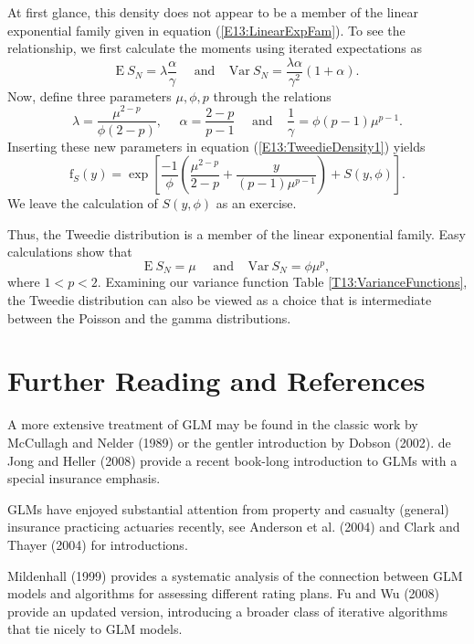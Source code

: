 At first glance, this density does not appear to be a member of the
linear exponential family given in equation
(\ref{E13:LinearExpFam}). To see the relationship, we first
calculate the moments using iterated expectations as
\begin{equation}\label{E13:MomentsTweedie}
\mathrm{E~}S_N = \lambda
\frac{\alpha}{\gamma}~~~~~~\mathrm{and}~~~~~ \mathrm{Var~}S_N =
\frac{\lambda \alpha}{\gamma^2} (1+\alpha).
\end{equation}
Now, define three parameters $\mu, \phi,  p$ through the relations
\begin{equation*}
\lambda = \frac{\mu^{2-p}}{\phi (2-p)},~~~~~~\alpha =
\frac{2-p}{p-1}~~~~~~\mathrm{and}~~~~~ \frac{1}{\gamma} =
\phi(p-1)\mu^{p-1}.
\end{equation*}
Inserting these new parameters in equation
(\ref{E13:TweedieDensity1}) yields
\begin{equation}\label{E13:TweedieDensity2}
\mathrm{f}_{S}(y) = \exp \left[ \frac{-1}{\phi} \left(
\frac{\mu^{2-p}}{2-p} + \frac{y}{(p-1)\mu^{p-1}} \right) +S(y,\phi)
\right].
\end{equation}
We leave the calculation of $S(y,\phi)$ as an exercise.

Thus, the Tweedie distribution is a member of the linear exponential
family. Easy calculations show that
\begin{equation}\label{E13:MomentsTweedie}
\mathrm{E~}S_N = \mu~~~~~~\mathrm{and}~~~~~ \mathrm{Var~}S_N = \phi
\mu^p,
\end{equation}
where $1<p<2.$ Examining our variance function Table
\ref{T13:VarianceFunctions}, the Tweedie distribution can also be
viewed as a choice that is intermediate between the Poisson and the
gamma distributions.


\section{Further Reading and References}

A more extensive treatment of GLM may be found in the classic work
by McCullagh and Nelder (1989) or the gentler introduction by Dobson
(2002). de Jong and Heller (2008) provide a recent book-long
introduction to GLMs with a special insurance emphasis.

GLMs have enjoyed substantial attention from property and casualty
(general) insurance practicing actuaries recently, see Anderson et
al. (2004) and Clark and Thayer (2004) for introductions.

Mildenhall (1999) provides a systematic analysis of the connection
between GLM models and algorithms for assessing different rating
plans. Fu and Wu (2008) provide an updated version, introducing a
broader class of iterative algorithms that tie nicely to GLM models.

